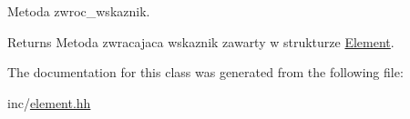 Metoda zwroc\+\_\+wskaznik. 

\begin{DoxyReturn}{Returns}
Metoda zwracajaca wskaznik zawarty w strukturze \hyperlink{class_element}{Element}. 
\end{DoxyReturn}


The documentation for this class was generated from the following file\+:\begin{DoxyCompactItemize}
\item 
inc/\hyperlink{element_8hh}{element.\+hh}\end{DoxyCompactItemize}
